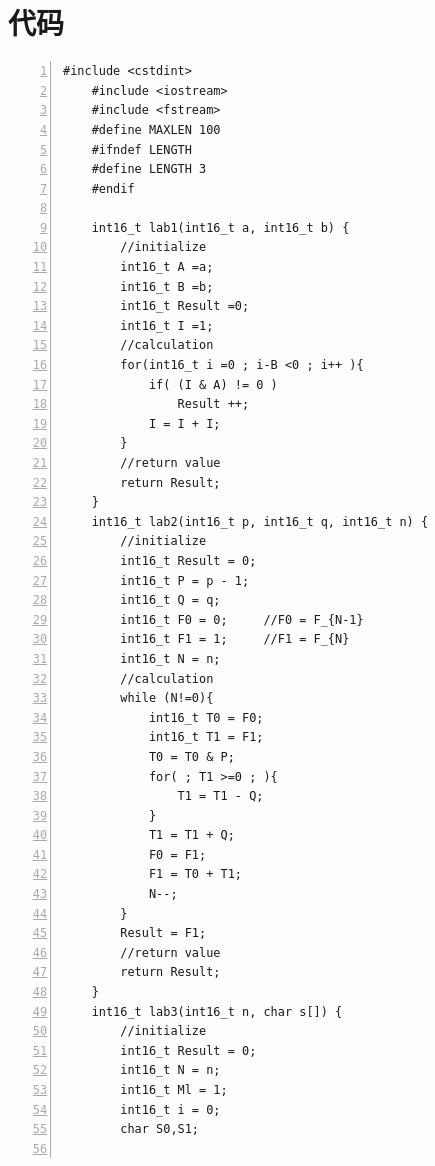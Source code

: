 \documentclass[UTF8]{ctexart}
\begin{document}
\clearpage
\section{代码}    
\begin{lstlisting}[language={[ANSI]C},numbers=left, numberstyle=\tiny, keywordstyle=\color{blue!70}, commentstyle=\color{red!50!green!50!blue!50}, frame=shadowbox, rulesepcolor=\color{red!20!green!20!blue!20}]
    #include <cstdint>
    #include <iostream>
    #include <fstream>
    #define MAXLEN 100
    #ifndef LENGTH
    #define LENGTH 3
    #endif
    
    int16_t lab1(int16_t a, int16_t b) {
        //initialize
        int16_t A =a;
        int16_t B =b;
        int16_t Result =0;
        int16_t I =1;
        //calculation
        for(int16_t i =0 ; i-B <0 ; i++ ){
            if( (I & A) != 0 )
                Result ++;
            I = I + I;
        }
        //return value
        return Result;
    }
    int16_t lab2(int16_t p, int16_t q, int16_t n) {
        //initialize
        int16_t Result = 0;
        int16_t P = p - 1;
        int16_t Q = q;
        int16_t F0 = 0;     //F0 = F_{N-1}
        int16_t F1 = 1;     //F1 = F_{N}
        int16_t N = n;
        //calculation
        while (N!=0){
            int16_t T0 = F0;
            int16_t T1 = F1;
            T0 = T0 & P;
            for( ; T1 >=0 ; ){
                T1 = T1 - Q;
            }
            T1 = T1 + Q;
            F0 = F1;
            F1 = T0 + T1;
            N--;
        }
        Result = F1;
        //return value
        return Result;
    }
    int16_t lab3(int16_t n, char s[]) {
        //initialize
        int16_t Result = 0;
        int16_t N = n;
        int16_t Ml = 1;
        int16_t i = 0;
        char S0,S1;
    

\end{lstlisting}
\end{document}
